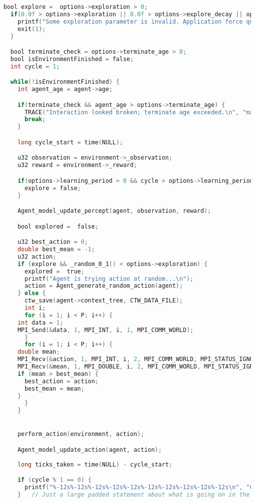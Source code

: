 \documentclass[fancychapters]{report}   	%
\begin{document}
\begin{lstlisting}[language=C,caption={main.c}]
  bool explore =  options->exploration > 0;
  if(0.0f > options->exploration || 0.0f > options->explore_decay || options->explore_decay > 1.0f) {
    printf("Some exploration parameter is invalid. Application force quitting.\n");
    exit(1);
  }

  bool terminate_check = options->terminate_age > 0;
  bool isEnvironmentFinished = false;
  int cycle = 1;

  while(!isEnvironmentFinished) {
    int agent_age = agent->age;

    if(terminate_check && agent_age > options->terminate_age) {
      TRACE("Interaction looked broken; terminate age exceeded.\n", "main");
      break;
    }

    long cycle_start = time(NULL);

    u32 observation = environment->_observation;
    u32 reward = environment->_reward;

    if(options->learning_period > 0 && cycle > options->learning_period) {
      explore = false;
    }

    Agent_model_update_percept(agent, observation, reward);

    bool explored =  false;

    u32 best_action = 0;
    double best_mean = -1;
    u32 action;
    if (explore && _random_0_1() < options->exploration) {
      explored =  true;
      printf("Agent is trying action at random...\n");
      action = Agent_generate_random_action(agent);
    } else {
      ctw_save(agent->context_tree, CTW_DATA_FILE);
      int i;
      for (i = 1; i < P; i++) {
	int data = 1;
	MPI_Send(&data, 1, MPI_INT, i, 1, MPI_COMM_WORLD);
      }
      for (i = 1; i < P; i++) {
	double mean;
	MPI_Recv(&action, 1, MPI_INT, i, 2, MPI_COMM_WORLD, MPI_STATUS_IGNORE);
	MPI_Recv(&mean, 1, MPI_DOUBLE, i, 2, MPI_COMM_WORLD, MPI_STATUS_IGNORE);
	if (mean > best_mean) {
	  best_action = action;
	  best_mean = mean;
	}
      }
    }


    perform_action(environment, action);

    Agent_model_update_action(agent, action);
	
    long ticks_taken = time(NULL) - cycle_start;

    if (cycle % 1 == 0) {
      printf("%-12s%-12s%-12s%-12s%-12s%-12s%-12s%-12s%-12s%-12s\n", "Cycle", "Observe.", "Reward", "Action", "Explored", "Exp. Rate", "Tot. Reward", "Avg Reward", "Time", "Model Size");
    }   // Just a large padded statement about what is going on in the world as we step through
 

\end{lstlisting}
\end{document}
